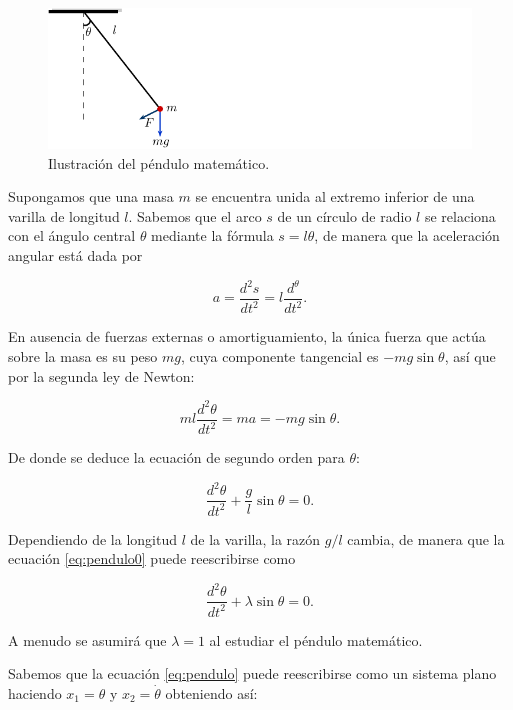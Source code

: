 \begin{example} \label{ej:pendulo}

\begin{figure}[!hb] \centering
	\includegraphics[scale=1.0]{figures/pendulum.pdf}
	\caption{Ilustración del péndulo matemático.}
	\label{fig:pendulo}
\end{figure}

Supongamos que una masa $m$ se encuentra unida al extremo inferior de una varilla de longitud $l$. Sabemos que el arco $s$ de un círculo de radio $l$ se relaciona con el ángulo central $\theta$ mediante la fórmula $s = l\theta$, de manera que la aceleración angular está dada por

$$ a = \dfrac{d^2s}{dt^2} = l \dfrac{d^\theta}{dt^2}.$$

En ausencia de fuerzas externas o amortiguamiento, la única fuerza que actúa sobre la masa es su peso $mg$, cuya componente tangencial es $-mg\sin\theta$, así que por la segunda ley de Newton:

$$ ml \dfrac{d^2\theta}{dt^2} = ma = -mg\sin\theta.$$

De donde se deduce la ecuación de segundo orden para $\theta$:

\begin{equation} \label{eq:pendulo0}
	\dfrac{d^2\theta}{dt^2} + \frac{g}{l}\sin\theta = 0.
\end{equation}

Dependiendo de la longitud $l$ de la varilla, la razón $g/l$ cambia, de manera que la ecuación \ref{eq:pendulo0} puede reescribirse como

\begin{equation} \label{eq:pendulo}
	\dfrac{d^2\theta}{dt^2} + \lambda\sin\theta = 0.
\end{equation}

A menudo se asumirá que $\lambda = 1$ al estudiar el péndulo matemático.

Sabemos que la ecuación \ref{eq:pendulo} puede reescribirse como un sistema plano haciendo $x_1 = \theta$ y $x_2 = \dot{\theta}$ obteniendo así:


\end{example}
